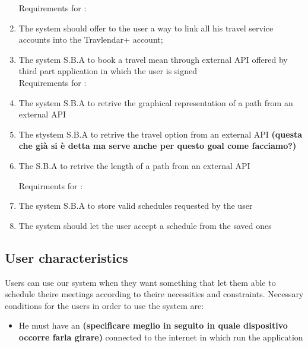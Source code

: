 \begin{enumerate}




Requirements for : 

\item The system should offer to the user a way to link all his travel service accounts into the Travlendar+ account;

\item The system S.B.A to book a travel mean through external API offered by third part application in which the user is signed
\\


Requirements for :

\item The system S.B.A to retrive the graphical representation of a path from an external API 

\item The stystem S.B.A to retrive the travel option from an external API \textbf{(questa che già si è detta ma serve anche per questo goal come facciamo?)}

\item The S.B.A to retrive the length of a path from an external API  

Requirments for :

\item The system S.B.A to store valid schedules requested by the user

\item The system should let the user accept a schedule from the saved ones 

\end{enumerate}


\subsection{User characteristics}
Users can use our system when they want something that let them able to schedule theire meetings according to theire necessities and constraints. Necessary conditions for the users in order to use the system are: 

\begin{itemize}
\item He must have an \textbf{(specificare meglio in seguito in quale dispositivo occorre farla girare)} connected to the internet in which run the application
\end{itemize}

